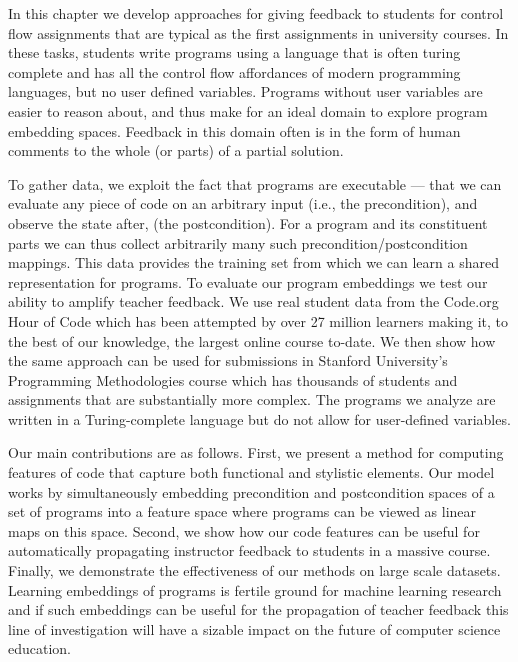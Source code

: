 In this chapter we develop approaches for giving feedback to students for control flow assignments that are typical as the first assignments in university courses. In these tasks, students write programs using a language that is often turing complete and has all the control flow affordances of modern programming languages, but no user defined variables. Programs without user variables are easier to reason about, and thus make for an ideal domain to explore program embedding spaces. Feedback in this domain often is in the form of human comments to the whole (or parts) of a partial solution. 


To gather data, we exploit the fact that programs are 
executable --- that we can evaluate any piece of code on 
an arbitrary input (i.e., the precondition), and observe the state  
after, (the postcondition). For a program and its 
constituent parts we can thus collect arbitrarily many such precondition/postcondition mappings. This %
data provides the training set from which we can learn a shared representation for programs. 
To evaluate our program embeddings we test our ability to amplify teacher feedback. We use real student data from the Code.org Hour of Code which has been attempted by over 27 million learners
making it, to the best of our knowledge,
the largest online course to-date. 
We then show how the same approach can be used for submissions in Stanford University's Programming Methodologies course which has thousands of students and assignments that are substantially more complex. The programs we analyze are written in a Turing-complete language but do not allow for user-defined variables.

Our main contributions are as follows. First, we present a 
method for computing features of code that capture both functional
and stylistic elements.  Our model works by simultaneously embedding precondition and postcondition spaces of 
a set of programs into a feature space where programs can be viewed as linear maps on this space.
Second, we show how our code features can be useful for automatically
propagating instructor feedback to students in a massive course.
Finally, we demonstrate the effectiveness of our methods
on large scale datasets.
Learning embeddings of programs is fertile ground for machine learning research and if such embeddings can be useful for the propagation of teacher feedback this line of investigation will have a sizable impact on the future of computer science education.


